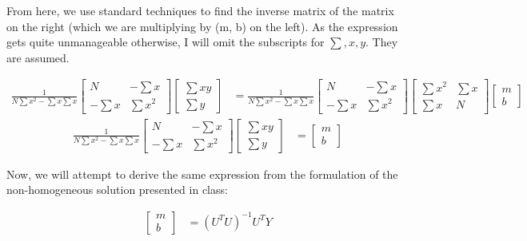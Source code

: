 \documentclass{article}
\begin{document}
From here, we use standard techniques to find the inverse matrix of the matrix 
on the right (which we are multiplying by (m, b) on the left). As the expression 
gets quite unmanageable otherwise, I will omit the subscripts for 
$ \sum, x, y $. They are assumed.

\begin{align*}
\frac{1}{N \sum x^2 - \sum x \sum x} \begin{bmatrix}
N        & - \sum x \\
- \sum x & \sum x^2
\end{bmatrix} \begin{bmatrix}
\sum x y \\
\sum y
\end{bmatrix} &= \frac{1}{N \sum x^2 - \sum x \sum x} \begin{bmatrix}
N        & - \sum x \\
- \sum x & \sum x^2
\end{bmatrix} \begin{bmatrix}
\sum x^2 & \sum x \\
\sum x   & N
\end{bmatrix} \begin{bmatrix}
m \\
b
\end{bmatrix}
\end{align*}
\begin{align*}
\frac{1}{N \sum x^2 - \sum x \sum x} \begin{bmatrix}
N        & - \sum x \\
- \sum x & \sum x^2
\end{bmatrix} \begin{bmatrix}
\sum x y \\
\sum y
\end{bmatrix} &= \begin{bmatrix}
m \\
b
\end{bmatrix}
\end{align*}

Now, we will attempt to derive the same expression from the formulation of the 
non-homogeneous solution presented in class:

\begin{align*}
\begin{bmatrix}
m \\
b
\end{bmatrix} &= (U^T U)^{-1} U^T Y
\end{align*}
\end{document}
